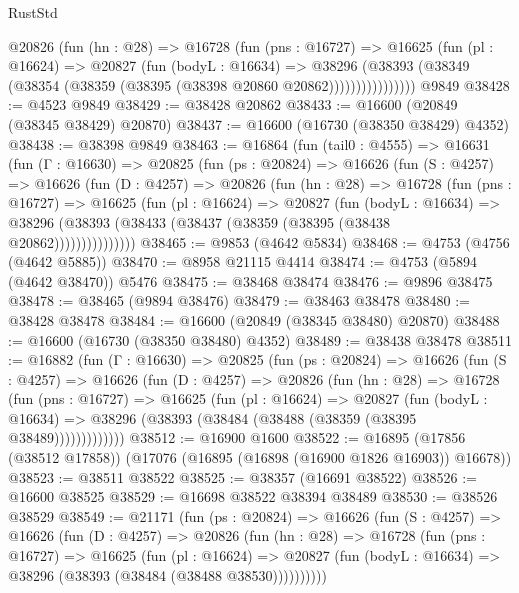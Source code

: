 \begin{lexlean}{RustStd}
\begin{coremodule}
{\begin{coremodule}
{{{{{{{{{{{{{{{{{{{{{{{{{{{{{{{{{{{{{{{{{{{{{{{{{{{{{{{              @20826
                (fun (hn : @28) =>
                @16728
                  (fun (pns : @16727) =>
                  @16625
                    (fun (pl : @16624) =>
                    @20827
                      (fun (bodyL : @16634) =>
                      @38296
                        (@38393
                          (@38349 (@38354 (@38359 (@38395 (@38398 @20860 @20862))))))))))))))))
    @9849
@38428 := @4523 @9849
@38429 := @38428 @20862
@38433 := @16600 (@20849 (@38345 @38429) @20870)
@38437 := @16600 (@16730 (@38350 @38429) @4352)
@38438 := @38398 @9849
@38463 := @16864
    (fun (tail0 : @4555) =>
    @16631
      (fun (Γ : @16630) =>
      @20825
        (fun (ps : @20824) =>
        @16626
          (fun (S : @4257) =>
          @16626
            (fun (D : @4257) =>
            @20826
              (fun (hn : @28) =>
              @16728
                (fun (pns : @16727) =>
                @16625
                  (fun (pl : @16624) =>
                  @20827
                    (fun (bodyL : @16634) =>
                    @38296 (@38393 (@38433 (@38437 (@38359 (@38395 (@38438 @20862)))))))))))))))
@38465 := @9853 (@4642 @5834)
@38468 := @4753 (@4756 (@4642 @5885))
@38470 := @8958 @21115 @4414
@38474 := @4753 (@5894 (@4642 @38470)) @5476
@38475 := @38468 @38474
@38476 := @9896 @38475
@38478 := @38465 (@9894 @38476)
@38479 := @38463 @38478
@38480 := @38428 @38478
@38484 := @16600 (@20849 (@38345 @38480) @20870)
@38488 := @16600 (@16730 (@38350 @38480) @4352)
@38489 := @38438 @38478
@38511 := @16882
    (fun (Γ : @16630) =>
    @20825
      (fun (ps : @20824) =>
      @16626
        (fun (S : @4257) =>
        @16626
          (fun (D : @4257) =>
          @20826
            (fun (hn : @28) =>
            @16728
              (fun (pns : @16727) =>
              @16625
                (fun (pl : @16624) =>
                @20827
                  (fun (bodyL : @16634) =>
                  @38296 (@38393 (@38484 (@38488 (@38359 (@38395 @38489)))))))))))))
@38512 := @16900 @1600
@38522 := @16895 (@17856 (@38512 @17858)) (@17076 (@16895 (@16898 (@16900 @1826 @16903)) @16678))
@38523 := @38511 @38522
@38525 := @38357 (@16691 @38522)
@38526 := @16600 @38525
@38529 := @16698 @38522 @38394 @38489
@38530 := @38526 @38529
@38549 := @21171
    (fun (ps : @20824) =>
    @16626
      (fun (S : @4257) =>
      @16626
        (fun (D : @4257) =>
        @20826
          (fun (hn : @28) =>
          @16728
            (fun (pns : @16727) =>
            @16625
              (fun (pl : @16624) =>
              @20827 (fun (bodyL : @16634) => @38296 (@38393 (@38484 (@38488 @38530))))))))))
}}}}}}}}}}}}}}}}}}}}}}}}}}}}}}}}}}}}}}}}}}}}}}}}}}}}}}}
\end{coremodule}}
\end{coremodule}
\end{lexlean}
